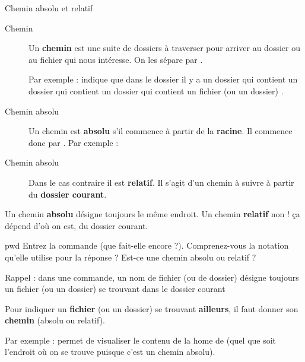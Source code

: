 \documentclass[a4paper,11pt]{style-esi/td}
\begin{document}
		\begin{theorie}{Chemin absolu et relatif}
			\begin{description}
			\item[Chemin]
				Un \textbf{chemin} est une suite de dossiers à traverser 
				pour arriver au dossier ou au fichier qui nous intéresse.
				On les sépare par \og{}\samp{/}\fg{}.

				Par exemple : 
				indique que dans le dossier 
				il y a un dossier 
				qui contient un dossier  
				qui contient un dossier  
				qui contient un fichier (ou un dossier) .
			\item[Chemin absolu]
				Un chemin est \textbf{absolu} 
				s'il commence à partir de la \textbf{racine}.
				Il commence donc par \og{}\samp{/}\fg{}.
				Par exemple : 
			\item[Chemin absolu]
				Dans le cas contraire il est \textbf{relatif}.
				Il s'agit d'un chemin à suivre à partir du \textbf{dossier courant}.
			\end{description}
		\end{theorie}

		\begin{alertbox}
			Un chemin \textbf{absolu} désigne toujours le même endroit.
			Un chemin \textbf{relatif} non ! \c ca dépend d'où on est,
			du dossier courant.
		\end{alertbox}

		\begin{Exercice}{pwd}
			Entrez la commande  (que fait-elle encore ?). 
			Comprenez-vous la notation qu'elle utilise pour la réponse ?
			Est-ce une chemin absolu ou relatif ?
		\end{Exercice}

		\begin{infobox}
			Rappel : dans une commande, un nom de fichier (ou de dossier)
			désigne toujours un fichier (ou un dossier) se trouvant
			dans le dossier courant
	
			Pour indiquer un \textbf{fichier} (ou un dossier) 
			se trouvant \textbf{ailleurs},
			il faut donner son \textbf{chemin} (absolu ou relatif).
		\end{infobox}

		Par exemple : 
		permet de visualiser le contenu de la home de 
		(quel que soit l'endroit où on se trouve puisque c'est un chemin absolu).
		
\end{document}
